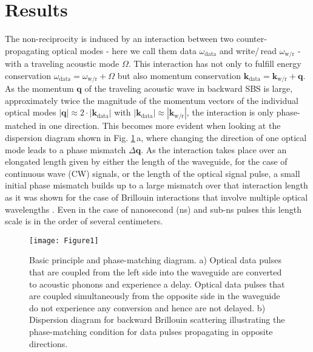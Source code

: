 \documentclass[superscriptaddress, nofootinbib, twocolumn, amsmath,amssymb, aps, pra, notitlepage, longbibliography]{revtex4-1}
\begin{document}
\section{Results}
The non-reciprocity is induced by an interaction between two counter-propagating optical modes - here we call them data \(\omega_\mathrm{data}\) and write/\,read \(\omega_\mathrm{w/r}\) - with a traveling acoustic mode \(\Omega\). This interaction has not only to fulfill energy conservation \(\omega_\mathrm{data} = \omega_\mathrm{w/r} + \Omega\) but also momentum conservation \(\mathbf{k}_\mathrm{data} = \mathbf{k}_\mathrm{w/r} + \mathbf{q}\). As the momentum \(\mathbf{q}\) of the traveling acoustic wave in backward SBS is large, approximately twice the magnitude of the momentum vectors of the individual optical modes \(|\mathbf{q}| \approx 2 \cdot |\mathbf{k}_\mathrm{data}|\) with \(|\mathbf{k}_\mathrm{data}| \approx |\mathbf{k}_\mathrm{w/r}|\), the interaction is only phase-matched in one direction. This becomes more evident when looking at the dispersion diagram shown in Fig. \ref{princ}\,a, where changing the direction of one optical mode leads to a phase mismatch \(\Delta \mathbf{q}\). As the interaction takes place over an elongated length given by either the length of the waveguide, for the case of continuous wave (CW) signals, or the length of the optical signal pulse, a small initial phase mismatch builds up to a large mismatch over that interaction length as it was shown for the case of Brillouin interactions that involve multiple optical wavelengths \cite{Stiller2019}. Even in the case of nanosecond (ns) and sub-ns pulses this length scale is in the order of several centimeters. \newline
%
\begin{figure}[h!]
\begin{center}
  \texttt{[image: Figure1]}
  \caption{Basic principle and phase-matching diagram. a) Optical data pulses that are coupled from the left side into the waveguide are converted to acoustic phonons and experience a delay. Optical data pulses that are coupled simultaneously from the opposite side in the waveguide do not experience any conversion and hence are not delayed. b) Dispersion diagram for backward Brillouin scattering illustrating the phase-matching condition for data pulses propagating in opposite directions.}
\label{princ}
\end{center}
\end{figure}
%
\end{document}
